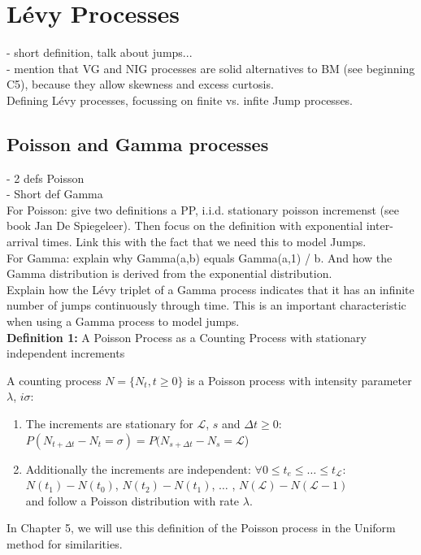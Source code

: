
\section{Lévy Processes}

- short definition, talk about jumps...\\
- mention that VG and NIG processes are solid alternatives to BM (see beginning C5), because they allow skewness and excess curtosis.\\

Defining Lévy processes, focussing on finite vs. infite Jump processes. 

\subsection{Poisson and Gamma processes}

- 2 defs Poisson \\
- Short def Gamma\\

For Poisson: give two definitions a PP, i.i.d. stationary poisson incremenst (see book Jan De Spiegeleer). Then focus on the definition with exponential inter-arrival times. Link this with the fact that we need this to model Jumps.\\

For Gamma: explain why Gamma(a,b) equals Gamma(a,1) / b. And how the Gamma distribution is derived from the exponential distribution.\\

Explain how the Lévy triplet of a Gamma process indicates that it has an infinite number of jumps continuously through time. This is an important characteristic when using a Gamma process to model jumps.\\

\textbf{Definition 1:} A Poisson Process as a Counting Process with stationary independent increments

A counting process $N=\{N_t, t\geq0\}$ is a Poisson process with intensity parameter $\lambda$, $i\sigma$:
\begin{enumerate}
    \item The increments are stationary for $\mathscr{L}$, $s$ and $\Delta t\geq0:$\\
    $P(N_{t+\Delta t} - N_t = \sigma) = P (N_{s+\Delta t} -N_s = \mathscr{L}$)
    \item Additionally the increments are independent: $\forall 0\leq t_e \leq \ldots \leq t_\mathscr{L}$:\\
    $N(t_1)-N(t_0)$, $N(t_2)-N(t_1)$, $\ldots$ , $N(\mathscr{L}) - N(\mathscr{L}-1)$\\
    and follow a Poisson distribution with rate $\lambda$.
\end{enumerate}
In Chapter 5, we will use this definition of the Poisson process in the Uniform method for similarities.\\

